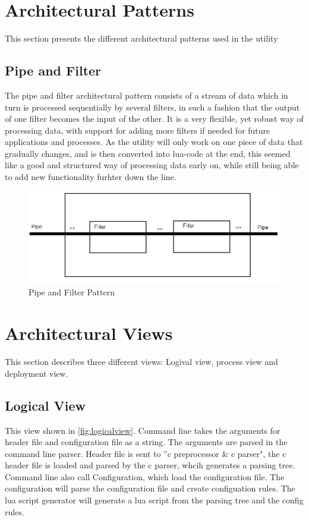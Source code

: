 \section{Architectural Patterns}
This section presents the different architectural patterns used in the \gls{utility}

\subsection{Pipe and Filter}
The pipe and filter architectural pattern consists of a stream of data which in turn is processed sequentially by several filters, in such a fashion that the output of one filter becomes the input of the other. It is a very flexible, yet robust way of processing data, with support for adding more filters if needed for future applications and processes. As the \gls{utility} will only work on one piece of data that gradually changes, and is then converted into \Gls{lua}-code at the end, this seemed like a good and structured way of processing data early on, while still being able to add new functionality furhter down the line.

\begin{figure}[htb]
	\includegraphics[width=\textwidth]{./planning/img/PipeAndFilter}
	\caption{Pipe and Filter Pattern\label{fig:pipefilter}}
\end{figure}


\section{Architectural Views}
This section describes three different views: Logival view, process view and deployment view.

\subsection{Logical View}
This view shown in \autoref{fig:logicalview}. Command line takes the arguments for \gls{header} file and configuration file as a string. The arguments are parsed in the command line \gls{parser}. Header file is sent to ''\Gls{c} \gls{preprocessor} \& \Gls{c} \gls{parser}", the \Gls{c} \gls{header} file is loaded and parsed by the \Gls{c} \gls{parser}, whcih generates a parsing tree. Command line also call Configuration, which load the configuration file. The configuration will parse the configuration file and create configuation rules. The \Gls{lua} \gls{script} generator will generate a \Gls{lua} \gls{script} from the parsing tree and the config rules.

